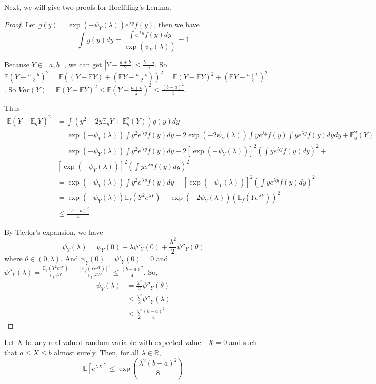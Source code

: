 \documentclass[11pt]{article}
\def\BR{{\mathbb R}}
\def\BE{{\mathbb E}}
\begin{document}
Next, we will give two proofs for Hoeffding's Lemma.

\begin{proof}
Let $g(y) = \exp(-\psi_Y(\lambda)) e^{\lambda y} f(y)$, then we have 
\[
\int g(y) dy = \frac{\int e^{\lambda y} f(y) dy}{\exp(\psi_Y(\lambda))} = 1
\]

Because $Y \in [a, b]$, we can get $|Y - \frac{a+b}{2}| \leq \frac{b - a}{a}$. So
$\BE (Y - \frac{a+b}{2})^2 = \BE((Y - \BE Y) + (\BE Y - \frac{a+b}{2}))^2 = \BE (Y - \BE Y)^2 + (\BE Y - \frac{a+b}{2})^2$. So $Var(Y) = \BE(Y - \BE Y)^2 \leq \BE (Y - \frac{a+b}{2})^2 \leq \frac{(b-a)^2}{4}$.

Thus 
\[\begin{split} 
\BE ( Y - \BE_g Y)^2 & = 
\int (y^2 - 2y\BE_gY + \BE_g^2(Y)) g(y) dy \\
&= \exp(-\psi_Y(\lambda )) \int y^2 e^{\lambda y} f(y) dy - 
2\exp(-2\psi_Y(\lambda ))\int y e^{\lambda y}f(y) \int y e^{\lambda y} f(y)dy dy + \BE_g^2(Y) \\
&= \exp(-\psi_Y(\lambda )) \int y^2 e^{\lambda y} f(y) dy -
2 [\exp(-\psi_Y(\lambda))]^2 \left(\int ye^{\lambda y}f(y) dy\right)^2 + \\
& [\exp(-\psi_Y(\lambda))]^2 \left(\int ye^{\lambda y}f(y) dy\right)^2 \\
&= \exp(-\psi_Y(\lambda )) \int y^2 e^{\lambda y} f(y) dy -
[\exp(-\psi_Y(\lambda))]^2 \left(\int ye^{\lambda y}f(y) dy\right)^2\\
& = \exp(-\psi_Y(\lambda)) \BE_f (Y^2 e^{\lambda Y}) - \exp(-2\psi_Y(\lambda))(\BE_f(Ye^{\lambda Y}))^2 \\
&\leq \frac{(b-a)^2}{4}
\end{split}\]

By Taylor's expansion, we have
\[
\psi_Y(\lambda ) = \psi_Y(0) + \lambda\psi'_Y(0) +  \frac{\lambda^2}{2} \psi''_Y(\theta)
\]
where $\theta \in (0, \lambda)$.
And $\psi_Y(0) = \psi'_Y(0) = 0$ and 
$\psi''_Y(\lambda) = \frac{\BE_f (Y^2 e^{\lambda Y})}{\BE_f e^{\lambda Y}} - \frac{[\BE_f(Ye^{\lambda Y})]^2}{\BE_f e^{2\lambda Y}} \leq \frac{(b-a)^2}{4}$.
So,
\[\begin{split}
\psi_Y(\lambda) &= \frac{\lambda^2}{2}\psi''_Y(\theta) \\
&\leq \frac{\lambda^2}{2}\psi''_Y(\lambda) \\
&\leq \frac{\lambda^2}{2} \frac{(b-a)^2}{4}
\end{split} \]
\end{proof}

Let $X$ be any real-valued random variable with expected value $\BE X = 0$ and such that $a \leq X \leq b$ almost surely. Then, for all $\lambda \in \BR$,\[ \BE[e^{\lambda X}] \leq \exp (\frac{\lambda^2 (b-a)^2}{8}) \]
\end{document}

